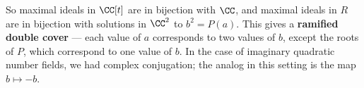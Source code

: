 So maximal ideals in $\CC[t]$ are in bijection with $\CC$, and maximal ideals in $R$ are in bijection with solutions in $\CC^2$ to $b^2 = P(a)$. This gives a \textbf{ramified double cover} --- each value of $a$ corresponds to two values of $b$, except the roots of $P$, which correspond to one value of $b$. In the case of imaginary quadratic number fields, we had complex conjugation; the analog in this setting is the map $b \mapsto -b$. 














